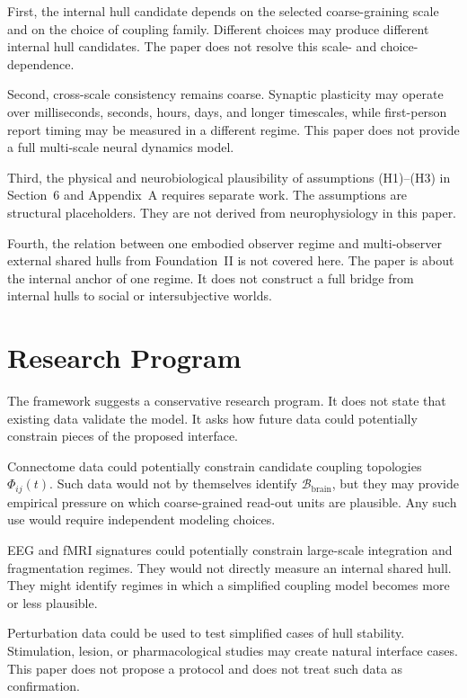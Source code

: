 \documentclass[12pt]{article}
\theoremstyle{definition}
\theoremstyle{remark}
\newcommand{\Bbrain}{\mathcal B_{\mathrm{brain}}}
\begin{document}
First, the internal hull candidate depends on the selected
coarse-graining scale and on the choice of coupling family. Different
choices may produce different internal hull candidates. The paper does
not resolve this scale- and choice-dependence.

Second, cross-scale consistency remains coarse. Synaptic plasticity may
operate over milliseconds, seconds, hours, days, and longer timescales,
while first-person report timing may be measured in a different regime.
This paper does not provide a full multi-scale neural dynamics model.

Third, the physical and neurobiological plausibility of assumptions
(H1)--(H3) in Section~6 and Appendix~A requires separate work. The assumptions are
structural placeholders. They are not derived from neurophysiology in
this paper.

Fourth, the relation between one embodied observer regime and
multi-observer external shared hulls from Foundation~II is not covered
here. The paper is about the internal anchor of one regime. It does not
construct a full bridge from internal hulls to social or intersubjective
worlds.

\section{Research Program}

The framework suggests a conservative research program. It does not
state that existing data validate the model. It asks how future data
could potentially constrain pieces of the proposed interface.

Connectome data could potentially constrain candidate coupling
topologies \(\Phi_{ij}(t)\). Such data would not by themselves identify
\(\Bbrain\), but they may provide empirical pressure on which
coarse-grained read-out units are plausible. Any such use would require
independent modeling choices.

EEG and fMRI signatures could potentially constrain large-scale
integration and fragmentation regimes. They would not directly measure
an internal shared hull. They might identify regimes in which a
simplified coupling model becomes more or less plausible.

Perturbation data could be used to test simplified cases of hull
stability. Stimulation, lesion, or pharmacological studies may create
natural interface cases. This paper does not propose a protocol and
does not treat such data as confirmation.
\end{document}
